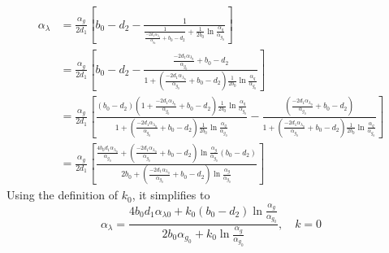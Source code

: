 \begin{align*}
    \alpha_\lambda &= \frac{\alpha_g}{2d_1} \left[ b_0 - d_2 - \frac{1}{\frac{1}{\frac{-2d_1\alpha_{\lambda_0}}{\alpha_{g_0}} + b_0 - d_2}+ \frac{1}{2b_0} \ln \frac{\alpha_q}{\alpha_{g_0}}}  \right]
    \\&= \frac{\alpha_g}{2d_1} \left[ b_0 - d_2 - \frac{\frac{-2d_1\alpha_{\lambda_0}}{\alpha_{g_0}} + b_0 - d_2}{1+\left(\frac{-2d_1\alpha_{\lambda_0}}{\alpha_{g_0}} + b_0 - d_2\right)\frac{1}{2b_0} \ln \frac{\alpha_q}{\alpha_{g_0}}}   \right]
    \\&= \frac{\alpha_g}{2d_1} \left[ \frac{(b_0 - d_2)\left(1+\frac{-2d_1\alpha_{\lambda_0}}{\alpha_{g_0}} + b_0 - d_2\right)\frac{1}{2b_0} \ln \frac{\alpha_q}{\alpha_{g_0}}}{{1} + \left(\frac{-2d_1\alpha_{\lambda_0}}{\alpha_{g_0}} + b_0 - d_2\right)\frac{1}{2b_0} \ln \frac{\alpha_q}{\alpha_{g_0}}} -\frac{\left(\frac{-2d_1\alpha_{\lambda_0}}{\alpha_{g_0}} + b_0 - d_2\right)}{{1} + \left(\frac{-2d_1\alpha_{\lambda_0}}{\alpha_{g_0}} + b_0 - d_2\right)\frac{1}{2b_0} \ln \frac{\alpha_q}{\alpha_{g_0}}} \right]
    \\&=\frac{\alpha_g}{2d_1} \left[ \frac{\frac{4b_0d_1\alpha_{\lambda_0}}{\alpha_{g_0}}+\left(\frac{-2d_1\alpha_{\lambda_0}}{\alpha_{g_0}} + b_0 - d_2\right)\ln \frac{\alpha_g}{\alpha_{g_0}}(b_0-d_2)}{{2b_0} + \left(\frac{-2d_1\alpha_{\lambda_0}}{\alpha_{g_0}} + b_0 - d_2\right) \ln \frac{\alpha_g}{\alpha_{g_0}}} \right]
\end{align*}
Using the definition of $k_0$, it simplifies to
\begin{equation}
    \boxed{\alpha_{\lambda} = \frac{ 4b_0 d_1 \alpha_{\lambda0} + k_0 (b_0 - d_2) \ln\frac{\alpha_g}{\alpha_{g_0}} }{ 2b_0 \alpha_{g_0} + k_0 \ln\frac{\alpha_g}{\alpha_{g_0}} } , \quad k=0 }
    \label{eq:alphalamkeq0}
\end{equation}


